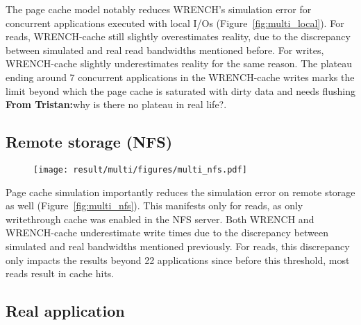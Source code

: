 \documentclass[conference]{IEEEtran}
\newcommand{\tristan}[1]{\color{orange}\textbf{From Tristan:}#1\color{black}}
\newcommand{\wrench}{WRENCH\xspace}
\begin{document}
            The page cache model notably reduces \wrench's simulation error
            for concurrent applications executed with local I/Os
            (Figure~\ref{fig:multi_local}). For reads, \wrench-cache still
            slightly overestimates reality, due to the discrepancy between
            simulated and real read bandwidths mentioned before. For writes,
            \wrench-cache slightly underestimates reality for the same reason. The plateau
            ending around 7 concurrent applications in the \wrench-cache writes
            marks the limit beyond which the page cache is saturated with dirty data
            and needs flushing \tristan{why is there no plateau in real life?}.

        \subsection{Remote storage (NFS)}

            \begin{figure*}
            \begin{subfigure}{\linewidth}
                \centering
                \texttt{[image: result/multi/figures/multi\_nfs.pdf]}
            \end{subfigure}
            \caption{NFS results with 3~GB files (averages on 5 repetitions)}
            \label{fig:multi_nfs}
            \end{figure*}

            Page cache simulation importantly reduces the simulation error
            on remote storage as well (Figure~\ref{fig:multi_nfs}). This
            manifests only for reads, as only writethrough cache was
            enabled in the NFS server. Both \wrench and \wrench-cache
            underestimate write times due to the discrepancy between
            simulated and real bandwidths mentioned previously. For reads,
            this discrepancy only impacts the results beyond 22
            applications since before this threshold, most reads result in cache
            hits.

        \subsection{Real application}
\end{document}
